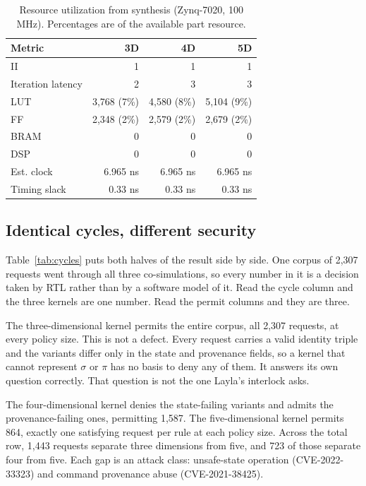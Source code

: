 \documentclass[conference]{IEEEtran}
\newcommand{\new}[1]{#1}
\begin{document}
\begin{table}[t]
\caption{Resource utilization from synthesis (Zynq-7020, 100 MHz). \new{Percentages are of the available part resource.}}
\label{tab:resources}
\centering
\begin{tabular}{lrrr}
\toprule
Metric & \new{3D} & 4D & 5D \\
\midrule
II & \new{1} & 1 & 1 \\
Iteration latency & \new{2} & 3 & 3 \\
LUT & \new{3{,}768 (7\%)} & 4{,}580 (8\%) & 5{,}104 (9\%) \\
FF & \new{2{,}348 (2\%)} & 2{,}579 (2\%) & 2{,}679 (2\%) \\
BRAM & \new{0} & 0 & 0 \\
DSP & \new{0} & 0 & 0 \\
\new{Est. clock} & \new{6.965 ns} & \new{6.965 ns} & \new{6.965 ns} \\
Timing slack & \new{0.33 ns} & 0.33 ns & 0.33 ns \\
\bottomrule
\end{tabular}
\end{table}

\subsection{\new{Identical cycles, different security}}

\new{Table~\ref{tab:cycles} puts both halves of the result side by side. One corpus of 2{,}307 requests went through all three co-simulations, so every number in it is a decision taken by RTL rather than by a software model of it. Read the cycle column and the three kernels are one number. Read the permit columns and they are three.}


\new{The three-dimensional kernel permits the entire corpus, all 2{,}307 requests, at every policy size. This is not a defect. Every request carries a valid identity triple and the variants differ only in the state and provenance fields, so a kernel that cannot represent $\sigma$ or $\pi$ has no basis to deny any of them. It answers its own question correctly. That question is not the one Layla's interlock asks.}

\new{The four-dimensional kernel denies the state-failing variants and admits the provenance-failing ones, permitting 1{,}587. The five-dimensional kernel permits 864, exactly one satisfying request per rule at each policy size. Across the total row, 1{,}443 requests separate three dimensions from five, and 723 of those separate four from five. Each gap is an attack class: unsafe-state operation (CVE-2022-33323) and command provenance abuse (CVE-2021-38425).}
\end{document}
